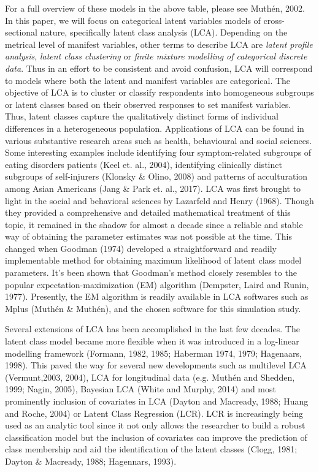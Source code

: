 \vspace{0.5em} 
For a full overview of these models in the above table, please see Muth\'en, 2002. In this paper, we will focus on categorical latent variables models of cross-sectional nature, specifically latent class analysis (LCA). Depending on the metrical level of manifest variables, other terms to describe LCA are \textit{latent profile analysis}, \textit{latent class clustering} or \textit{finite mixture modelling of categorical discrete data}. Thus in an effort to be consistent and avoid confusion, LCA will correspond to models where both the latent and manifest variables are categorical. The objective of LCA is to cluster or classify respondents into homogeneous subgroups or latent classes based on their observed responses to set manifest variables. Thus, latent classes capture the qualitatively distinct forms of individual differences in a heterogeneous population. Applications of LCA can be found in various substantive research areas such as health, behavioural and social sciences. Some interesting examples include identifying four symptom-related subgroups of eating disorders patients (Keel et. al., 2004), identifying clinically distinct subgroups of self-injurers (Klonsky \& Olino, 2008) and patterns of acculturation among Asian Americans (Jang & Park et. al., 2017). LCA was first brought to light in the social and behavioral sciences by Lazarfeld and Henry (1968). Though they provided a comprehensive and detailed mathematical treatment of this topic, it remained in the shadow for almost a decade since a reliable and stable way of obtaining the parameter estimates was not possible at the time. This changed when Goodman (1974) developed a straightforward and readily implementable method for obtaining maximum likelihood of latent class model parameters. It's been shown that Goodman's method closely resembles to the popular expectation-maximization (EM) algorithm (Dempster, Laird and Runin, 1977). Presently, the EM algorithm is readily available in LCA softwares such as Mplus (Muth\'en & Muth\'en), and the chosen software for this simulation study. 

Several extensions of LCA has been accomplished in the last few decades. The latent class model became more flexible when it was introduced in a log-linear modelling framework (Formann, 1982, 1985; Haberman 1974, 1979; Hagenaars, 1998). This paved the way  for several new developments such as multilevel LCA (Vermunt,2003, 2004), LCA for longitudinal data (e.g. Muth\'en and Shedden, 1999; Nagin, 2005), Bayesian LCA (White and Murphy, 2014) and most prominently inclusion of covariates in LCA (Dayton and Macready, 1988; Huang and Roche, 2004) or Latent Class Regression (LCR). LCR is increasingly being used as an analytic tool since it not only allows the researcher to build a robust classification model but the inclusion of covariates can improve the prediction of class membership and aid the identification of the latent classes (Clogg, 1981; Dayton & Macready, 1988; Hagennars, 1993). 

